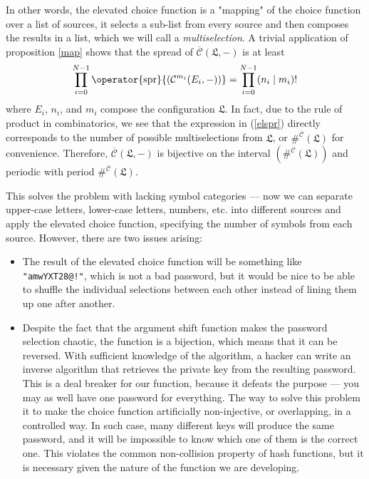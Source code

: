 \documentclass[12pt, a4paper]{article}
\renewcommand{\C}{\mathcal{C}}
\newcommand{\CC}{\overline{\mathcal{C}}}
\newcommand{\conf}{\mathfrak{L}}
\newcommand{\spr}[1]{\operator{\mathrm{spr}}{\left(#1\right)}}
\begin{document}
In other words, the elevated choice function is a "mapping" of the choice function over a list of sources, it selects a sub-list from every source and then composes the results in a list, which we will call a \emph{multiselection}. A trivial application of proposition \ref{map} shows that the spread of $ \CC(\conf, -) $ is at least
\begin{equation}\label{elspr}
    \prod\limits_{i = 0}^{N-1} \spr{\C^{m_i}(E_i, -)} = \prod\limits_{i = 0}^{N-1} (n_i \mid m_i)!
\end{equation}
where $ E_i $, $ n_i $, and $ m_i $ compose the configuration $ \conf $. In fact, due to the rule of product in combinatorics, we see that the expression in (\ref{elspr}) directly corresponds to the number of possible multiselections from $ \conf $, or $ \#^{\CC}(\conf) $ for convenience. Therefore, $ \CC(\conf, -) $ is bijective on the interval $ \left(\#^{\CC}(\conf)\right) $ and periodic with period $ \#^{\CC}(\conf) $.

This solves the problem with lacking symbol categories --- now we can separate upper-case letters, lower-case letters, numbers, etc. into different sources and apply the elevated choice function, specifying the number of symbols from each source. However, there are two issues arising:

\begin{itemize}
    \item The result of the elevated choice function will be something like \texttt{"amwYXT28@!"}, which is not a bad password, but it would be nice to be able to shuffle the individual selections between each other instead of lining them up one after another.
    \item Despite the fact that the argument shift function makes the password selection chaotic, the function is a bijection, which means that it can be reversed. With sufficient knowledge of the algorithm, a hacker can write an inverse algorithm that retrieves the private key from the resulting password. This is a deal breaker for our function, because it defeats the purpose --- you may as well have one password for everything. The way to solve this problem it to make the choice function artificially non-injective, or overlapping, in a controlled way. In such case, many different keys will produce the same password, and it will be impossible to know which one of them is the correct one. This violates the common non-collision property of hash functions, but it is necessary given the nature of the function we are developing.
\end{itemize}
\end{document}
